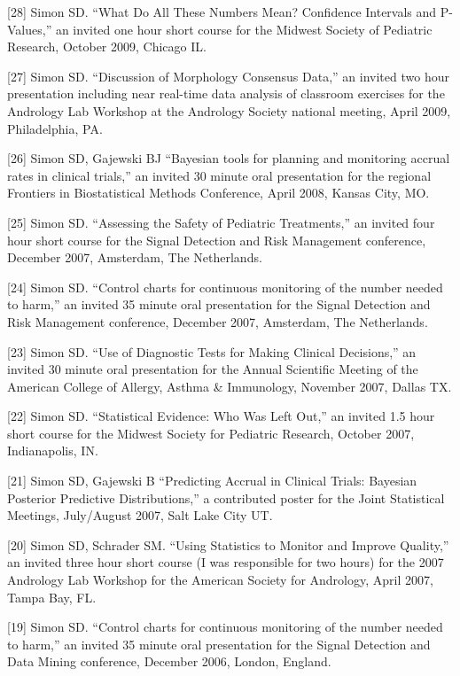 \documentclass[
  12pt,
]{article}
\begin{document}
{[}28{]} Simon SD. ``What Do All These Numbers Mean? Confidence
Intervals and P-Values,'' an invited one hour short course for the
Midwest Society of Pediatric Research, October 2009, Chicago IL.

{[}27{]} Simon SD. ``Discussion of Morphology Consensus Data,'' an
invited two hour presentation including near real-time data analysis of
classroom exercises for the Andrology Lab Workshop at the Andrology
Society national meeting, April 2009, Philadelphia, PA.

{[}26{]} Simon SD, Gajewski BJ ``Bayesian tools for planning and
monitoring accrual rates in clinical trials,'' an invited 30 minute oral
presentation for the regional Frontiers in Biostatistical Methods
Conference, April 2008, Kansas City, MO.

{[}25{]} Simon SD. ``Assessing the Safety of Pediatric Treatments,'' an
invited four hour short course for the Signal Detection and Risk
Management conference, December 2007, Amsterdam, The Netherlands.

{[}24{]} Simon SD. ``Control charts for continuous monitoring of the
number needed to harm,'' an invited 35 minute oral presentation for the
Signal Detection and Risk Management conference, December 2007,
Amsterdam, The Netherlands.

{[}23{]} Simon SD. ``Use of Diagnostic Tests for Making Clinical
Decisions,'' an invited 30 minute oral presentation for the Annual
Scientific Meeting of the American College of Allergy, Asthma \&
Immunology, November 2007, Dallas TX.

{[}22{]} Simon SD. ``Statistical Evidence: Who Was Left Out,'' an
invited 1.5 hour short course for the Midwest Society for Pediatric
Research, October 2007, Indianapolis, IN.

{[}21{]} Simon SD, Gajewski B ``Predicting Accrual in Clinical Trials:
Bayesian Posterior Predictive Distributions,'' a contributed poster for
the Joint Statistical Meetings, July/August 2007, Salt Lake City UT.

{[}20{]} Simon SD, Schrader SM. ``Using Statistics to Monitor and
Improve Quality,'' an invited three hour short course (I was responsible
for two hours) for the 2007 Andrology Lab Workshop for the American
Society for Andrology, April 2007, Tampa Bay, FL.

{[}19{]} Simon SD. ``Control charts for continuous monitoring of the
number needed to harm,'' an invited 35 minute oral presentation for the
Signal Detection and Data Mining conference, December 2006, London,
England.
\end{document}
